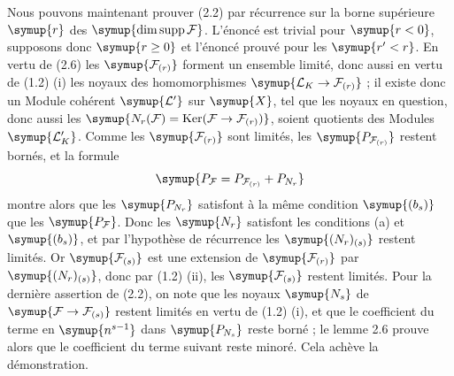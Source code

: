 Nous pouvons maintenant prouver (2.2) par récurrence sur la borne supérieure
$\symup{r}$ des $\symup{\dim\operatorname{supp}\mathcal F}$. L'énoncé est trivial pour $\symup{r<0}$,
supposons donc $\symup{r\geq0}$ et l'énoncé prouvé pour les $\symup{r'<r}$. En vertu de (2.6)
les $\symup{\mathcal F_{(r)}}$ forment un ensemble limité, donc aussi en vertu de (1.2)
(i) les noyaux des homomorphismes
$\symup{\mathcal L_K\to\mathcal F_{(r)}}$ ; il existe donc un Module
cohérent $\symup{\mathcal L'}$ sur $\symup{X}$, tel que les noyaux en question, donc aussi les
$\symup{N_r(\mathcal F)=\operatorname{Ker}(\mathcal F\to\mathcal F_{(r)})}$, soient quotients des Modules $\symup{\mathcal L'_K}$. Comme les $\symup{\mathcal F_{(r)}}$ sont
limités, les $\symup{P_{\mathcal F_{(r)}}}$ restent bornés, et la formule
\[
\symup{P_{\mathcal F}=P_{\mathcal F_{(r)}}+P_{N_r}}
\]
montre alors que les $\symup{P_{N_r}}$ satisfont à la même condition $\symup{(b_s)}$ que les
$\symup{P_{\mathcal F}}$. Donc les $\symup{N_r}$ satisfont les conditions (a) et $\symup{(b_s)}$, et
par l'hypothèse de récurrence les $\symup{(N_r)_{(s)}}$ restent limités. Or
$\symup{\mathcal F_{(s)}}$ est une extension de $\symup{\mathcal F_{(r)}}$ par
$\symup{(N_r)_{(s)}}$, donc par (1.2) (ii), les $\symup{\mathcal F_{(s)}}$ restent limités.
Pour la dernière assertion de (2.2), on note que les noyaux $\symup{N_s}$ de
$\symup{\mathcal F\to\mathcal F_{(s)}}$ restent limités en vertu de (1.2)
(i), et que le coefficient du terme en $\symup{n^{s-1}}$ dans $\symup{P_{N_s}}$ reste borné ;
le lemme 2.6 prouve alors que le coefficient du terme suivant reste minoré.
Cela achève la démonstration.


